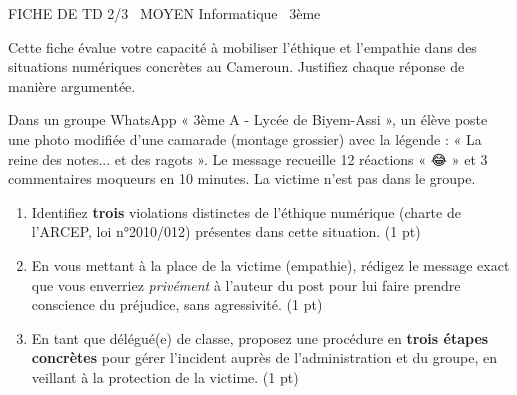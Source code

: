 \documentclass[11pt]{article}
\begin{document}
\begin{tcolorbox}[enhanced,colback=popink,colframe=popink,arc=10pt,boxrule=0pt,left=12pt,right=12pt,top=9pt,bottom=9pt]
{\color{white}\popxbold\small FICHE DE TD 2/3 \textbullet\ MOYEN \hfill Informatique \textbullet\ 3ème\par}
\end{tcolorbox}
\vspace{4pt}
Cette fiche évalue votre capacité à mobiliser l'éthique et l'empathie dans des situations numériques concrètes au Cameroun. Justifiez chaque réponse de manière argumentée.

\begin{exercice}
Dans un groupe WhatsApp « 3ème A - Lycée de Biyem-Assi », un élève poste une photo modifiée d'une camarade (montage grossier) avec la légende : « La reine des notes... et des ragots ». Le message recueille 12 réactions « 😂 » et 3 commentaires moqueurs en 10 minutes. La victime n'est pas dans le groupe.
\begin{enumerate}
    \item Identifiez \textbf{trois} violations distinctes de l'éthique numérique (charte de l'ARCEP, loi n°2010/012) présentes dans cette situation. (1 pt)
    \item En vous mettant à la place de la victime (empathie), rédigez le message exact que vous enverriez \textit{privément} à l'auteur du post pour lui faire prendre conscience du préjudice, sans agressivité. (1 pt)
    \item En tant que délégué(e) de classe, proposez une procédure en \textbf{trois étapes concrètes} pour gérer l'incident auprès de l'administration et du groupe, en veillant à la protection de la victime. (1 pt)
\end{enumerate}
\end{exercice}
\end{document}
